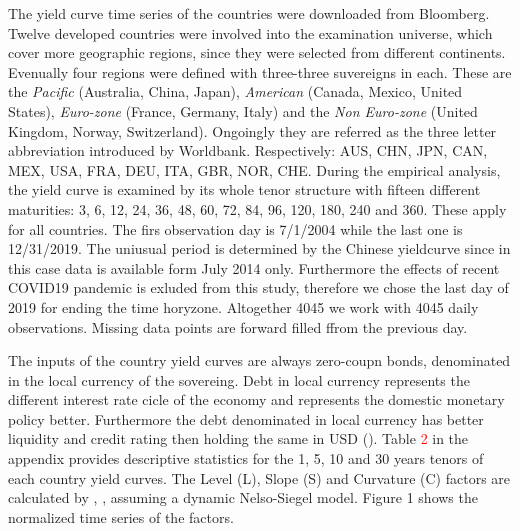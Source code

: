 \documentclass[12pt,bibliography=totoc]{article}
\begin{document}
The yield curve time series of the countries were downloaded from Bloomberg. Twelve developed countries were involved into the examination universe, which cover more geographic regions, since they were selected from different continents. Evenually four regions were defined with three-three suvereigns in each. These are the \textit{Pacific} (Australia, China, Japan), \textit{American} (Canada, Mexico, United States), \textit{Euro-zone} (France, Germany, Italy) and the \textit{Non Euro-zone} (United Kingdom, Norway, Switzerland). Ongoingly they are referred as the three letter abbreviation introduced by Worldbank. Respectively:  AUS, CHN, JPN, CAN, MEX, USA, FRA, DEU, ITA, GBR, NOR, CHE. During the empirical analysis, the yield curve is examined by its whole tenor structure with fifteen different maturities: 3, 6, 12, 24, 36, 48, 60, 72, 84, 96, 120, 180, 240 and 360. These apply for all countries. The firs observation day is 7/1/2004 while the last one is 12/31/2019. The uniusual period is determined by the Chinese yieldcurve since in this case data is available form July 2014 only. Furthermore the effects of recent COVID19 pandemic is exluded from this study, therefore we chose the last day of 2019 for ending the time horyzone. Altogether 4045 we work with 4045 daily observations. Missing data points are forward filled ffrom the previous day.

The inputs of the country yield curves are always zero-coupn bonds, denominated in the local currency of the sovereing. Debt in local currency represents the different interest rate cicle of the economy and represents the domestic monetary policy better. Furthermore the debt denominated in local currency has better liquidity and credit rating then holding the same in USD  (\cite{sowmya2016linkages}). Table \textcolor{red}{2} in the appendix provides descriptive statistics for the 1, 5, 10 and 30 years tenors of each country yield curves. The Level (L), Slope (S) and Curvature (C) factors are calculated by \cite{diebold2006forecasting}, \cite{diebold2008global}, assuming a dynamic Nelso-Siegel model. Figure 1 shows the normalized time series of the factors.

\end{document}

